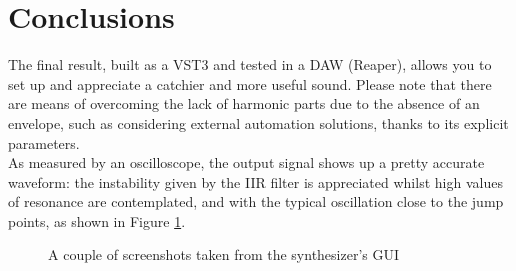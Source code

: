 \documentclass[11pt]{article}
\begin{document}
\section{Conclusions}

The final result, built as a VST3 and tested in a DAW (Reaper), allows you to set up and appreciate a catchier and more useful sound. Please note that there are means of overcoming the lack of harmonic parts due to the absence of an envelope, such as considering external automation solutions, thanks to its explicit parameters.\\
As measured by an oscilloscope, the output signal shows up a pretty accurate waveform: the instability given by the IIR filter is appreciated whilst high values of resonance are contemplated, and with the typical oscillation close to the jump points, as shown in Figure \ref{fig:waves}.

\begin{figure}
\centering
{}
\label{fig:waves}
\caption{A couple of screenshots taken from the synthesizer's GUI}
\end{figure}
\end{document}
